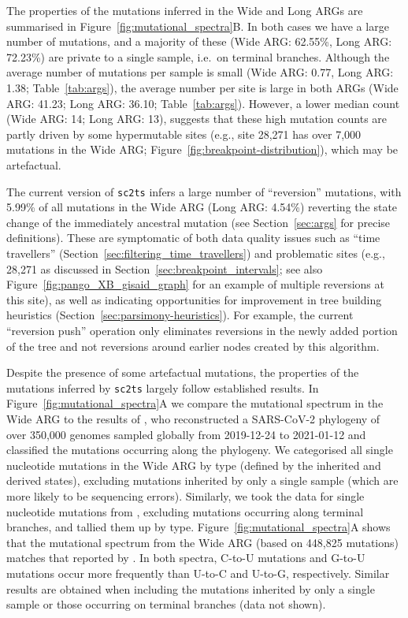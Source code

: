 \documentclass{article}
\begin{document}
The properties of the mutations inferred in the Wide and Long
ARGs are summarised in Figure~\ref{fig:mutational_spectra}B. In both
cases we have a large number of mutations, and a majority of these
(Wide ARG: 62.55\%, Long ARG: 72.23\%) are private to a single
sample, i.e.\ on terminal branches.
Although the average number
of mutations per sample is small
(Wide ARG: 0.77, Long ARG: 1.38; Table~\ref{tab:args}),
the average number per site
is large in both ARGs (Wide ARG: 41.23; Long ARG: 36.10; Table~\ref{tab:args}).
However, a lower median count (Wide ARG: 14; Long ARG: 13),
suggests that these high mutation counts are
partly driven by some hypermutable sites (e.g., site 28,271 has over 7,000
mutations in the Wide ARG; Figure~\ref{fig:breakpoint-distribution}), which
may be artefactual.

The current version of \texttt{sc2ts} infers a
large number of ``reversion'' mutations, with 5.99\% of all mutations in the Wide
ARG (Long ARG: 4.54\%) reverting the state change of the immediately
ancestral mutation (see Section~\ref{sec:args} for precise definitions).
These are symptomatic of both data quality issues
such as ``time travellers'' (Section~\ref{sec:filtering_time_travellers})
and problematic sites (e.g., 28,271 as discussed in
Section~\ref{sec:breakpoint_intervals}; see also
Figure~\ref{fig:pango_XB_gisaid_graph} for an example of multiple
reversions at this site), as well as indicating opportunities
for improvement in tree building heuristics
(Section~\ref{sec:parsimony-heuristics}).
For example, the current ``reversion push'' operation
only eliminates reversions in the newly added portion of the tree
and not reversions around earlier nodes created by this algorithm.

Despite the presence of some artefactual mutations,
the properties of the mutations inferred by \texttt{sc2ts} largely follow
established results.
In Figure~\ref{fig:mutational_spectra}A we compare the mutational spectrum
in the Wide ARG to the results of \cite{Yi2021-sc},
who reconstructed a SARS-CoV-2 phylogeny of
over 350,000 genomes sampled globally from 2019-12-24 to 2021-01-12
and classified the mutations occurring along the phylogeny.
We categorised all single nucleotide
mutations in the Wide ARG by type (defined by the inherited and derived states),
excluding mutations inherited by only a single sample (which are
more likely to be sequencing errors).
Similarly, we took the data for single nucleotide mutations from
\citet[][\url{https://github.com/ju-lab/SC2_evol_signature}]{Yi2021-sc}, excluding
mutations occurring along terminal branches, and tallied them up by type.
Figure~\ref{fig:mutational_spectra}A shows that the mutational spectrum from the
Wide ARG (based on 448,825 mutations) matches that reported by \citet[based on
92,344 mutations]{Yi2021-sc}. In both spectra, C-to-U mutations and G-to-U
mutations occur more frequently than U-to-C and U-to-G, respectively. Similar
results are obtained when including the mutations inherited by only a single
sample or those occurring on terminal branches (data not shown).
\end{document}
